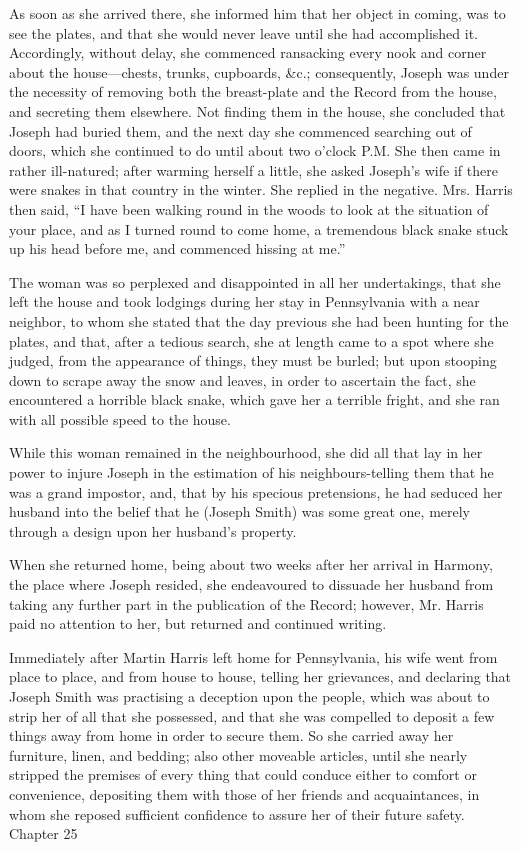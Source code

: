 		As soon as she arrived there, she informed him that her object in coming, was to see the plates, and that she would never leave until she had accomplished it. Accordingly, without delay, she commenced ransacking every nook and corner about the house---chests, trunks, cupboards, \&c.; consequently, Joseph was under the necessity of removing both the breast-plate and the Record from the house, and secreting them elsewhere. Not finding them in the house, she concluded that Joseph had buried them, and the next day she commenced searching out of doors, which she continued to do until about two o'clock P.M. She then came in rather ill-natured; after warming herself a little, she asked Joseph's wife if there were snakes in that country in the winter. She replied in the negative. Mrs. Harris then said, ``I have been walking round in the woods to look at the situation of your place, and as I turned round to come home, a tremendous black snake stuck up his head before me, and commenced hissing at me.''

		The woman was so perplexed and disappointed in all her undertakings, that she left the house and took lodgings during her stay in Pennsylvania with a near neighbor, to whom she stated that the day previous she had been hunting for the plates, and that, after a tedious search, she at length came to a spot where she judged, from the appearance of things, they must be burled; but upon stooping down to scrape away the snow and leaves, in order to ascertain the fact, she encountered a horrible black snake, which gave her a terrible fright, and she ran with all possible speed to the house.

		While this woman remained in the neighbourhood, she did all that lay in her power to injure Joseph in the estimation of his neighbours-telling them that he was a grand impostor, and, that by his specious pretensions, he had seduced her husband into the belief that he (Joseph Smith) was some great one, merely through a design upon her husband's property.

		When she returned home, being about two weeks after her arrival in Harmony, the place where Joseph resided, she endeavoured to dissuade her husband from taking any further part in the publication of the Record; however, Mr. Harris paid no attention to her, but returned and continued writing.

		Immediately after Martin Harris left home for Pennsylvania, his wife went from place to place, and from house to house, telling her grievances, and declaring that Joseph Smith was practising a deception upon the people, which was about to strip her of all that she possessed, and that she was compelled to deposit a few things away from home in order to secure them. So she carried away her furniture, linen, and bedding; also other moveable articles, until she nearly stripped the premises of every thing that could conduce either to comfort or convenience, depositing them with those of her friends and acquaintances, in whom she reposed sufficient confidence to assure her of their future safety.
		Chapter 25

